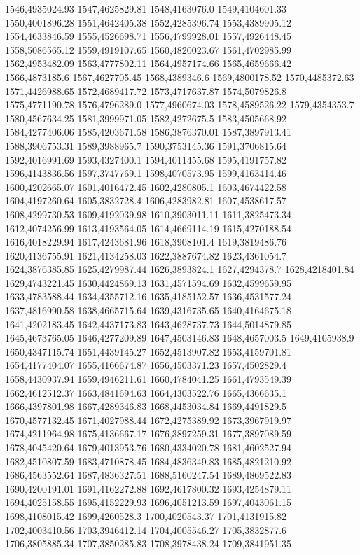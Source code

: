 1546,4935024.93
1547,4625829.81
1548,4163076.0
1549,4104601.33
1550,4001896.28
1551,4642405.38
1552,4285396.74
1553,4389905.12
1554,4633846.59
1555,4526698.71
1556,4799928.01
1557,4926448.45
1558,5086565.12
1559,4919107.65
1560,4820023.67
1561,4702985.99
1562,4953482.09
1563,4777802.11
1564,4957174.66
1565,4659666.42
1566,4873185.6
1567,4627705.45
1568,4389346.6
1569,4800178.52
1570,4485372.63
1571,4426988.65
1572,4689417.72
1573,4717637.87
1574,5079826.8
1575,4771190.78
1576,4796289.0
1577,4960674.03
1578,4589526.22
1579,4354353.7
1580,4567634.25
1581,3999971.05
1582,4272675.5
1583,4505668.92
1584,4277406.06
1585,4203671.58
1586,3876370.01
1587,3897913.41
1588,3906753.31
1589,3988965.7
1590,3753145.36
1591,3706815.64
1592,4016991.69
1593,4327400.1
1594,4011455.68
1595,4191757.82
1596,4143836.56
1597,3747769.1
1598,4070573.95
1599,4163414.46
1600,4202665.07
1601,4016472.45
1602,4280805.1
1603,4674422.58
1604,4197260.64
1605,3832728.4
1606,4283982.81
1607,4538617.57
1608,4299730.53
1609,4192039.98
1610,3903011.11
1611,3825473.34
1612,4074256.99
1613,4193564.05
1614,4669114.19
1615,4270188.54
1616,4018229.94
1617,4243681.96
1618,3908101.4
1619,3819486.76
1620,4136755.91
1621,4134258.03
1622,3887674.82
1623,4361054.7
1624,3876385.85
1625,4279987.44
1626,3893824.1
1627,4294378.7
1628,4218401.84
1629,4743221.45
1630,4424869.13
1631,4571594.69
1632,4599659.95
1633,4783588.44
1634,4355712.16
1635,4185152.57
1636,4531577.24
1637,4816990.58
1638,4665715.64
1639,4316735.65
1640,4164675.18
1641,4202183.45
1642,4437173.83
1643,4628737.73
1644,5014879.85
1645,4673765.05
1646,4277209.89
1647,4503146.83
1648,4657003.5
1649,4105938.9
1650,4347115.74
1651,4439145.27
1652,4513907.82
1653,4159701.81
1654,4177404.07
1655,4166674.87
1656,4503371.23
1657,4502829.4
1658,4430937.94
1659,4946211.61
1660,4784041.25
1661,4793549.39
1662,4612512.37
1663,4841694.63
1664,4303522.76
1665,4366635.1
1666,4397801.98
1667,4289346.83
1668,4453034.84
1669,4491829.5
1670,4577132.45
1671,4027988.44
1672,4275389.92
1673,3967919.97
1674,4211964.98
1675,4136667.17
1676,3897259.31
1677,3897089.59
1678,4045420.64
1679,4013953.76
1680,4334020.78
1681,4602527.94
1682,4510807.59
1683,4710878.45
1684,4836349.83
1685,4821210.92
1686,4563552.64
1687,4836327.51
1688,5160247.54
1689,4869522.83
1690,4200191.01
1691,4162272.88
1692,4617800.32
1693,4254879.11
1694,4025158.55
1695,4152229.93
1696,4051213.59
1697,4043061.15
1698,4108015.42
1699,4260528.3
1700,4020543.37
1701,4131915.82
1702,4003410.56
1703,3946412.14
1704,4005546.27
1705,3832877.6
1706,3805885.34
1707,3850285.83
1708,3978438.24
1709,3841951.35
